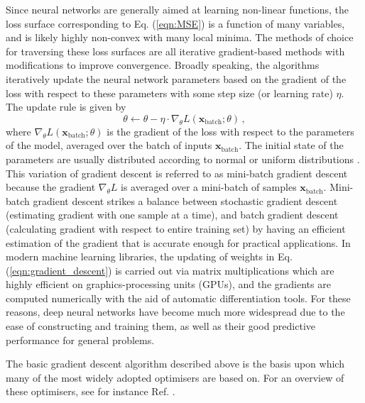 \documentclass[main.tex]{subfiles}
\begin{document}
    Since neural networks are generally aimed at
    learning non-linear functions, the loss surface
    corresponding to Eq. (\ref{eqn:MSE}) is
    a function of many variables, and is likely highly
    non-convex with many local minima.
    The methods of choice for traversing these loss surfaces
    are all iterative gradient-based methods with modifications
    to improve convergence. Broadly speaking, the algorithms
    iteratively update the neural network parameters based on the
    gradient of the loss with respect to these parameters
    with some step size (or learning rate) $\eta$. The update
    rule is given by
    \begin{equation}\label{eqn:gradient_descent}
        \theta \gets \theta - \eta \cdot \nabla_{\theta} L(\mathbf{x}_{\mathrm{batch}}; \theta) \, ,
    \end{equation}
    where $\nabla_{\theta}L(\mathbf{x}_{\mathrm{batch}}; \theta)$ is the
    gradient of the loss with respect to the parameters of the
    model, averaged over the batch of inputs $\mathbf{x}_{\mathrm{batch}}$.
    The initial state of the parameters
    are usually distributed according to normal
    or uniform distributions \cite{pmlr-v9-glorot10a,he_initialiser}.
    This variation of gradient descent is referred to
    as mini-batch gradient descent because the gradient
    $\nabla_{\theta}L$ is averaged over a mini-batch of
    samples $\mathbf{x}_{\mathrm{batch}}$. Mini-batch gradient
    descent strikes a balance between stochastic gradient
    descent (estimating gradient with one sample at a time),
    and batch gradient descent (calculating gradient with
    respect to entire training set) by having an efficient
    estimation of the gradient that is accurate enough
    for practical applications. In modern machine learning
    libraries, the updating of weights in Eq. (\ref{eqn:gradient_descent})
    is carried out via matrix multiplications which are
    highly efficient on graphics-processing units (GPUs),
    and the gradients are computed numerically with the aid
    of automatic differentiation tools. For these reasons, deep
    neural networks have become much more widespread due
    to the ease of constructing and training them, as well
    as their good predictive performance for general problems.

    The basic gradient descent algorithm described above
    is the basis upon which many of the most widely
    adopted optimisers \cite{kiefer1952stochastic,hintonrmsprop,Kingma:2014vow}
    are based on. For an overview of these optimisers, see for instance
    Ref. \cite{Ruder:2016lil}.
\end{document}
